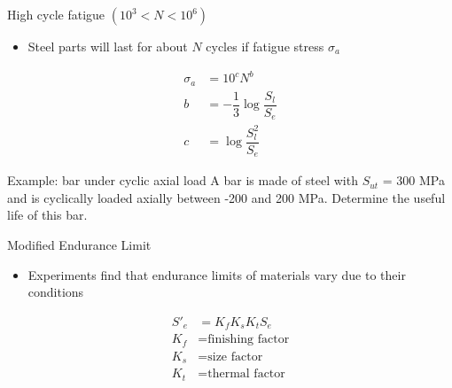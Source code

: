\documentclass[10pt, svgnames]{beamer}
\begin{document}
\begin{frame}[label={sec:org443a1c1}]{High cycle fatigue \((10^3 < N < 10^6)\)}
\begin{itemize}
\item Steel parts will last for about \(N\) cycles if fatigue stress \(\sigma_a\)
\end{itemize}

\begin{align*}
  \sigma_a &= 10^c N^b \\
  b &= -\dfrac{1}{3}   \log\dfrac{S_l}{S_e} \\
  c &= \log \dfrac{S_l^2}{S_e}
\end{align*}
\end{frame}


\begin{frame}[label={sec:orgc86405a}]{Example: bar under cyclic axial load}
A bar is made of steel with \(S_{ut}\) = 300 MPa and is cyclically loaded axially between -200 and 200 MPa. Determine the useful life of this bar.
\end{frame}



\begin{frame}[label={sec:org14ff795}]{Modified Endurance Limit}
\begin{itemize}
\item Experiments find that endurance limits of materials vary due to their conditions
\end{itemize}

\begin{align*}
  S'_e &= K_f K_s K_t S_e  \\[10pt]
  K_f &= \text{finishing factor} \\
  K_s &= \text{size factor} \\
  K_t &= \text{thermal factor}
\end{align*}
\end{frame}
\end{document}
